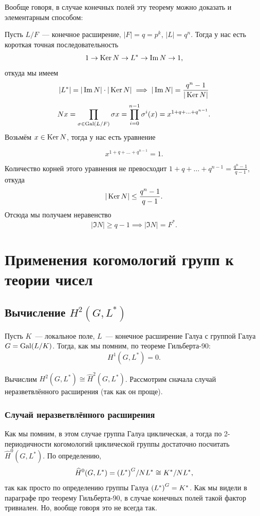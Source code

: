 	Вообще говоря, в случае конечных полей эту теорему можно доказать и элементарным способом: 

	Пусть $L/F$~--- конечное расширение, $|F| = q = p^k$, $|L| = q^n$. Тогда у нас есть короткая точная последовательность 
	\[
		1 \to \Ker{N} \to L^* \to \Im{N} \to 1,
	\]
	откуда мы имеем 
	\[
		|L^*| = |\Im{N}| \cdot |\Ker{N}| \implies |\Im{N}| = \frac{q^n - 1}{|\Ker{N}|}
	\]
	\[	
		Nx = \prod_{\sigma \in \Gal(L/F)} \sigma x = \prod_{i = 0}^{n - 1} \sigma^i(x) = x^{1 + q + \ldots + q^{n - 1}}.
	\]
	Возьмём $x \in \Ker{N}$, тогда у нас есть уравнение 

	\[
		x^{1 + q + \ldots + q^{n - 1}} = 1.
	\]

	Количество корней этого уравнения не превосходит $1 + q + \ldots + q^{n - 1} = \frac{q^n - 1}{q - 1}$,  откуда 
	\[
		|\Ker{N}| \le \frac{q^n - 1}{q - 1}.
	\]
	Отсюда мы получаем неравенство 
	\[
		|\Im{N}| \ge q - 1 \implies |\Im{N}| = F^*.
	\]

	\section{Применения когомологий групп к теории чисел}

	\subsection{Вычисление $H^2(G, L^*)$}

	Пусть $K$~--- локальное поле, $L$~--- конечное расширение Галуа с группой Галуа $G = \Gal(L/K)$. Тогда, как мы помним, по теореме Гильберта-90:
	\[
		H^1(G, L^*) = 0.
	\]

	Вычислим $H^{2}(G, L^*) \cong \widehat{H}^2(G, L^*)$. Рассмотрим сначала случай неразветвлённого расширения (так как он проще). 

	\subsubsection{Случай неразветвлённого расширения}

	Как мы помним, в этом случае группа Галуа циклическая, а тогда по 2-периодичности когомологий циклической группы достаточно посчитать $\widehat{H}^0(G, L^*)$. По определению, 
	\[
		\widehat{H}^0(G, L^*) = \lr*{L^*}^G/N L^* \cong K^* / NL^*,
	\]
	так как просто по определению группы Галуа $\lr*{L^*}^G = K^*$. Как мы видели в параграфе про теорему Гильберта-90, в случае конечных полей такой фактор тривиален. Но, вообще говоря это не всегда так. 

